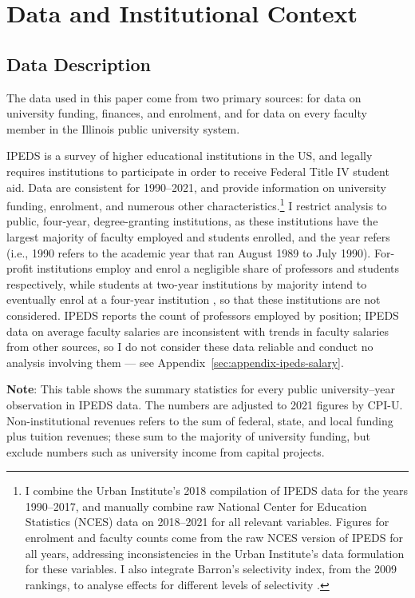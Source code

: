 \section{Data and Institutional Context}
\label{sec:data}

\subsection{Data Description}
\label{sec:data-desc}
The data used in this paper come from two primary sources: \citet[IPEDS]{ipeds} for data on university funding, finances, and enrolment, and \citet[IBHED]{ibhed} for data on every faculty member in the Illinois public university system.

IPEDS is a survey of higher educational institutions in the US, and legally requires institutions to participate in order to receive Federal Title IV student aid.
Data are consistent for 1990--2021,
and provide information on university funding, enrolment, and numerous other characteristics.\footnote{
    I combine the Urban Institute's 2018 compilation of IPEDS data for the years 1990--2017, and manually combine raw National Center for Education Statistics (NCES) data on 2018--2021 for all relevant variables.
    Figures for enrolment and faculty counts come from the raw NCES version of IPEDS for all years, addressing inconsistencies in the Urban Institute's data formulation for these variables.
    I also integrate Barron's selectivity index, from the 2009 rankings, to analyse effects for different levels of selectivity \citep{barrons2009}.
}
I restrict analysis to public, four-year, degree-granting institutions, as these institutions have the largest majority of faculty employed and students enrolled, and the year refers (i.e., 1990 refers to the academic year that ran August 1989 to July 1990).
For-profit institutions employ and enrol a negligible share of professors and students respectively, while students at two-year institutions by majority intend to eventually enrol at a four-year institution \citep{mountjoy2022}, so that these institutions are not considered.
IPEDS reports the count of professors employed by position; IPEDS data on average faculty salaries are inconsistent with trends in faculty salaries from other sources, so I do not consider these data reliable and conduct no analysis involving them --- see Appendix~\ref{sec:appendix-ipeds-salary}.

\begin{table}[!h]
    \singlespacing
    \caption{IPEDS Summary Statistics, Public Universities 1990--2021}
    \makebox[\textwidth][c]{}
    \label{tab:ipeds-summary}
    \justify
    \footnotesize
    \textbf{Note}:
    This table shows the summary statistics for every public university--year observation in IPEDS data.
    The numbers are adjusted to 2021 figures by CPI-U.
    Non-institutional revenues refers to the sum of federal, state, and local funding plus tuition revenues; these sum to the majority of university funding, but exclude numbers such as university income from capital projects.
\end{table}

